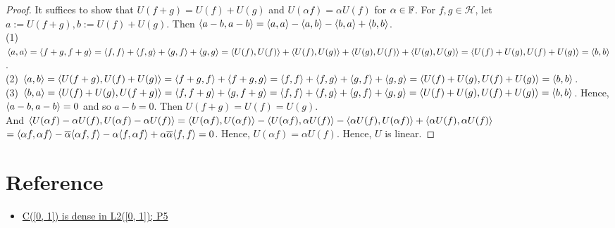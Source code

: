 \begin{proof}
    It suffices to show that $U(f+g)=U(f)+U(g)$ and $U(\alpha f)=\alpha U(f)$ for $\alpha\in\mathbb{F}$.
    For $f,g\in \mathscr{H}$, let $a:=U(f+g),b:=U(f)+U(g)$. Then $\langle a-b,a-b\rangle=\langle a,a\rangle-\langle a,b\rangle-\langle b,a\rangle+\langle b,b\rangle$. \\
    (1) $\langle a,a\rangle=\langle f+g,f+g\rangle=\langle f,f\rangle+\langle f,g\rangle+\langle g,f\rangle+\langle g,g\rangle=\langle U(f),U(f)\rangle+\langle U(f),U(g)\rangle+\langle U(g),U(f)\rangle+\langle U(g),U(g)\rangle=\langle U(f)+U(g),U(f)+U(g)\rangle=\langle b,b\rangle$.\\
    (2) $\langle a,b\rangle=\langle U(f+g),U(f)+U(g)\rangle=\langle f+g,f\rangle+\langle f+g,g\rangle=\langle f,f\rangle+\langle f,g\rangle+\langle g,f\rangle+\langle g,g\rangle=\langle U(f)+U(g),U(f)+U(g)\rangle=\langle b,b\rangle$.\\
    (3) $\langle b,a\rangle=\langle U(f)+U(g),U(f+g)\rangle=\langle f,f+g\rangle+\langle g,f+g\rangle=\langle f,f\rangle+\langle f,g\rangle+\langle g,f\rangle+\langle g,g\rangle=\langle U(f)+U(g),U(f)+U(g)\rangle=\langle b,b\rangle$.
    Hence, $\langle a-b,a-b\rangle=0$ and so $a-b=0$. Then $U(f+g)=U(f)=U(g)$.\\
    And $\langle U(\alpha f)-\alpha U(f),U(\alpha f)-\alpha U(f)\rangle=\langle U(\alpha f),U(\alpha f)\rangle-\langle U(\alpha f),\alpha U(f)\rangle-\langle\alpha U(f),U(\alpha f)\rangle+\langle\alpha U(f),\alpha U(f)\rangle$
    $=\langle\alpha f,\alpha f\rangle-\overline{\alpha}\langle\alpha f,f\rangle-\alpha\langle f,\alpha f\rangle+\alpha\overline{\alpha}\langle f,f\rangle=0$. Hence, $U(\alpha f)=\alpha U(f)$.
    Hence, $U$ is linear.
\end{proof}

\section{Reference}

\begin{itemize}
    \item \href{https://personal.math.ubc.ca/~malabika/teaching/ubc/spring18/math421-510/HW3-Solution.pdf}{C([0, 1]) is dense in L2([0, 1]); P5}
\end{itemize}